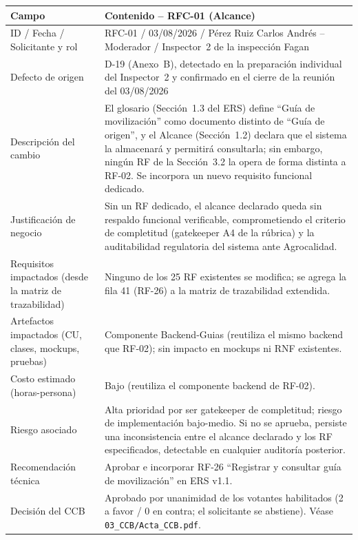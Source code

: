 \documentclass[11pt,a4paper]{article}
\begin{document}
\begin{longtable}{|p{4.5cm}|p{9.5cm}|}
\hline
\textbf{Campo} & \textbf{Contenido -- RFC-01 (Alcance)} \\
\hline
ID / Fecha / Solicitante y rol & RFC-01 / 03/08/2026 / Pérez Ruiz Carlos Andrés -- Moderador / Inspector~2 de la inspección Fagan \\
\hline
Defecto de origen & D-19 (Anexo~B), detectado en la preparación individual del Inspector~2 y confirmado en el cierre de la reunión del 03/08/2026 \\
\hline
Descripción del cambio & El glosario (Sección~1.3 del ERS) define ``Guía de movilización'' como documento distinto de ``Guía de origen'', y el Alcance (Sección~1.2) declara que el sistema la almacenará y permitirá consultarla; sin embargo, ningún RF de la Sección~3.2 la opera de forma distinta a RF-02. Se incorpora un nuevo requisito funcional dedicado. \\
\hline
Justificación de negocio & Sin un RF dedicado, el alcance declarado queda sin respaldo funcional verificable, comprometiendo el criterio de completitud (gatekeeper A4 de la rúbrica) y la auditabilidad regulatoria del sistema ante Agrocalidad. \\
\hline
Requisitos impactados (desde la matriz de trazabilidad) & Ninguno de los 25 RF existentes se modifica; se agrega la fila 41 (RF-26) a la matriz de trazabilidad extendida. \\
\hline
Artefactos impactados (CU, clases, mockups, pruebas) & Componente Backend-Guias (reutiliza el mismo backend que RF-02); sin impacto en mockups ni RNF existentes. \\
\hline
Costo estimado (horas-persona) & Bajo (reutiliza el componente backend de RF-02). \\
\hline
Riesgo asociado & Alta prioridad por ser gatekeeper de completitud; riesgo de implementación bajo-medio. Si no se aprueba, persiste una inconsistencia entre el alcance declarado y los RF especificados, detectable en cualquier auditoría posterior. \\
\hline
Recomendación técnica & Aprobar e incorporar RF-26 ``Registrar y consultar guía de movilización'' en ERS v1.1. \\
\hline
Decisión del CCB & Aprobado por unanimidad de los votantes habilitados (2 a favor / 0 en contra; el solicitante se abstiene). Véase \texttt{03\_CCB/Acta\_CCB.pdf}. \\
\hline
\end{longtable}
\end{document}

